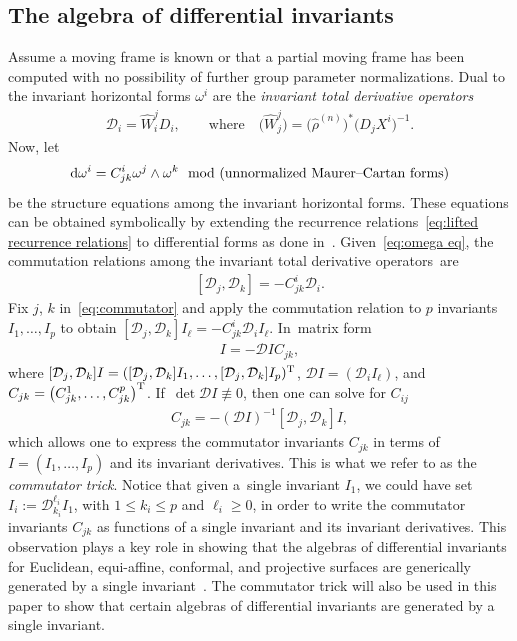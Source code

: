 \documentclass[pdftex]{sigma}%
\numberwithin{equation}{section}
\newcommand{\D}{\mathcal{D}}
\newcommand{\n}{^{(n)}}
\begin{document}
\subsection{The algebra of differential invariants}

Assume a moving frame is known or that a partial moving frame has been computed with no possibility of further group parameter normalizations. Dual to the invariant horizontal forms $\omega^i$ are the \emph{invariant total derivative operators}
\begin{gather}\label{eq:invariant derivative operators}
\D_i = \widehat{W}^j_i D_i,\qquad \text{where}\quad \big(\widehat{W}^j_j\big) = \big(\widehat{\rho}\n\big)^*\big(D_j X^i\big)^{-1}.
\end{gather}
Now, let
%
\begin{gather}\label{eq:omega eq}
{\rm d}\omega^i = C^i_{jk} \omega^j\wedge\omega^k
\mod(\text{unnormalized Maurer--Cartan forms})
\end{gather}
%
be the structure equations among the invariant horizontal forms. These equations can be obtai\-ned symbolically by extending the recurrence relations~\eqref{eq:lifted recurrence relations} to differential forms as done in~\cite{KO-2003}. Given~\eqref{eq:omega eq}, the commutation relations among the invariant total derivative opera\-tors~are
%
\begin{gather}\label{eq:commutator}
[\D_j,\D_k]=-C^i_{jk} \D_i.
\end{gather}
%
Fix $j$, $k$ in~\eqref{eq:commutator} and apply the commutation relation to $p$ invariants $I_1,\dots,I_p$
to obtain $[\D_j,\D_k]I_\ell = -C^i_{jk} \D_i I_\ell$. In~matrix form
\begin{gather*}
[\D_j,\D_k] I = - \D I C_{jk},
\end{gather*}
where $[\D_j,\D_k] I = ([\D_j,\D_k] I_1,\dots,[\D_j,\D_k] I_p)^{\rm T}$, $\D I = (\D_i I_\ell)$, and $C_{jk} = \big(C^1_{jk},\dots, C^p_{jk}\big)^{\rm T}$. If~$\det \D I \not\equiv 0$, then one can solve for $C_{ij}$
%
\begin{gather}\label{eq:commutator trick}
C_{jk} = -(\D I)^{-1} [\D_j,\D_k] I,
\end{gather}
%
which allows one to express the commutator invariants $C_{jk}$ in terms of $I=(I_1,\dots,I_p)$ and its invariant derivatives. This is what we refer to as the \emph{commutator trick}. Notice that given a~single invariant $I_1$, we could have set $I_i:=\D_{k_i}^{\ell_i} I_1$, with $1\leq k_i \leq p$ and $\ell_i\geq 0$, in order to write the commutator invariants $C_{jk}$ as functions of a single invariant and its invariant derivatives. This observation plays a key role in showing that the algebras of differential invariants for Euclidean, equi-affine, conformal, and projective surfaces are generically generated by a single invariant~\cite{HO-2007,O-2009diff,O-2016}. The commutator trick will also be used in this paper to show that certain algebras of differential invariants are generated by a single invariant.
\end{document}
